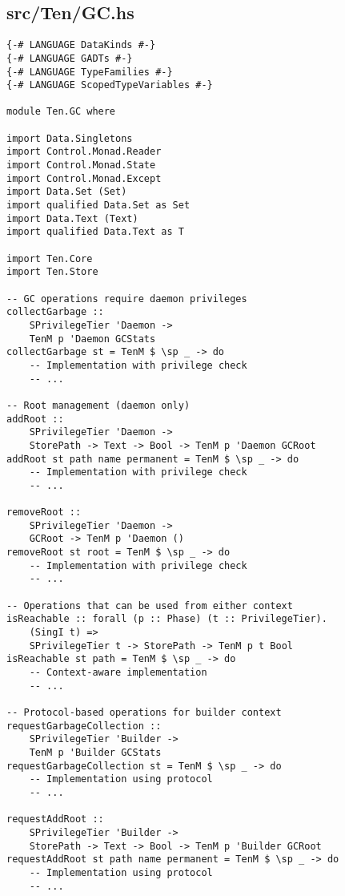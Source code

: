 \documentclass{article}
\begin{document}
\subsection{src/Ten/GC.hs}

\begin{tcolorbox}[title=Ten/GC.hs Changes]
\begin{verbatim}
{-# LANGUAGE DataKinds #-}
{-# LANGUAGE GADTs #-}
{-# LANGUAGE TypeFamilies #-}
{-# LANGUAGE ScopedTypeVariables #-}

module Ten.GC where

import Data.Singletons
import Control.Monad.Reader
import Control.Monad.State
import Control.Monad.Except
import Data.Set (Set)
import qualified Data.Set as Set
import Data.Text (Text)
import qualified Data.Text as T

import Ten.Core
import Ten.Store

-- GC operations require daemon privileges
collectGarbage ::
    SPrivilegeTier 'Daemon ->
    TenM p 'Daemon GCStats
collectGarbage st = TenM $ \sp _ -> do
    -- Implementation with privilege check
    -- ...

-- Root management (daemon only)
addRoot ::
    SPrivilegeTier 'Daemon ->
    StorePath -> Text -> Bool -> TenM p 'Daemon GCRoot
addRoot st path name permanent = TenM $ \sp _ -> do
    -- Implementation with privilege check
    -- ...

removeRoot ::
    SPrivilegeTier 'Daemon ->
    GCRoot -> TenM p 'Daemon ()
removeRoot st root = TenM $ \sp _ -> do
    -- Implementation with privilege check
    -- ...

-- Operations that can be used from either context
isReachable :: forall (p :: Phase) (t :: PrivilegeTier).
    (SingI t) =>
    SPrivilegeTier t -> StorePath -> TenM p t Bool
isReachable st path = TenM $ \sp _ -> do
    -- Context-aware implementation
    -- ...

-- Protocol-based operations for builder context
requestGarbageCollection ::
    SPrivilegeTier 'Builder ->
    TenM p 'Builder GCStats
requestGarbageCollection st = TenM $ \sp _ -> do
    -- Implementation using protocol
    -- ...

requestAddRoot ::
    SPrivilegeTier 'Builder ->
    StorePath -> Text -> Bool -> TenM p 'Builder GCRoot
requestAddRoot st path name permanent = TenM $ \sp _ -> do
    -- Implementation using protocol
    -- ...
\end{verbatim}
\end{tcolorbox}
\end{document}
